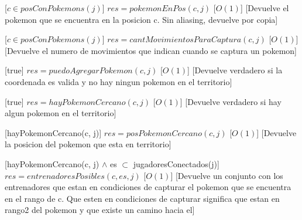 \begin{Interfaz}
%
[$c \in posConPokemons(j)$]
{$res = pokemonEnPos(c, j)$}%
[$O(1)$] %
[Devuelve el pokemon que se encuentra en la posicion c. Sin aliasing, devuelve por copia]


%
[$c \in posConPokemons(j)$] %
{$res = cantMovimientosParaCaptura(c, j)$}%
[$O(1)$] %
[Devuelve el numero de movimientos que indican cuando se captura un pokemon]



%
[true] 
{$res = puedoAgregarPokemon(c, j)$}  %
[$O(1)$] 
[Devuelve verdadero si la coordenada es valida y no hay ningun pokemon en el territorio]


%
[true] 
{$res = hayPokemonCercano(c, j)$}  %
[$O(1)$] 
[Devuelve verdadero si hay algun pokemon en el territorio]


%
[hayPokemonCercano(c, j)] 
{$res = posPokemonCercano(c, j)$}  %
[$O(1)$] 
[Devuelve la posicion del pokemon que esta en territorio]



%
[hayPokemonCercano(c, j) $\land$ es $\subset$ jugadoresConectados(j)] 
{$res = entrenadoresPosibles(c, es, j)$}  %
[$O(1)$] %
[Devuelve un conjunto con los entrenadores que estan en condiciones de capturar el pokemon que se encuentra en el rango de c. Que esten en condiciones de capturar significa que estan en rango2 del pokemon y que existe un camino hacia el]



\end{Interfaz}
